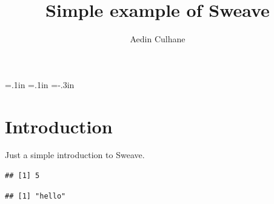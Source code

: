 \textwidth=6.2in
\textheight=8.5in
\oddsidemargin=.1in
\evensidemargin=.1in
\headheight=-.3in


\newcommand{\scscst}{\scriptscriptstyle}
\newcommand{\scst}{\scriptstyle}
\newcommand{\Robject}[1]{{\texttt{#1}}}
\newcommand{\Rfunction}[1]{{\texttt{#1}}}
\newcommand{\Rclass}[1]{\textit{#1}}
\newcommand{\Rpackage}[1]{\textit{#1}}
\newcommand{\Rexpression}[1]{\texttt{#1}}
\newcommand{\Rmethod}[1]{{\texttt{#1}}}
\newcommand{\Rfunarg}[1]{{\texttt{#1}}}



\title{Simple example of Sweave}
\author{Aedin Culhane}



\maketitle
\tableofcontents


\section{Introduction}

Just a simple introduction to Sweave. 

\begin{knitrout}
\color{fgcolor}\begin{kframe}
\begin{alltt}
\hlkwb{=}
\hlkwb{=}
\hlopt{+}
\end{alltt}
\begin{verbatim}
## [1] 5
\end{verbatim}
\begin{alltt}
\hlstd{(}\hlstd{)}
\end{alltt}
\begin{verbatim}
## [1] "hello"
\end{verbatim}
\end{kframe}
\end{knitrout}

